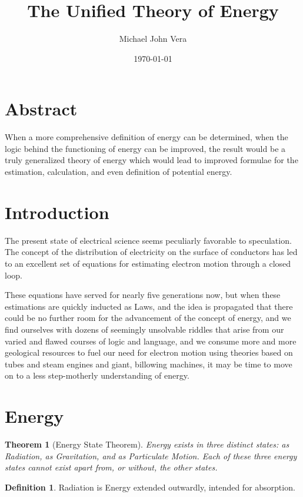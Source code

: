 \documentclass[12pt]{article}
\title{The Unified Theory of Energy}
\author{Michael John Vera}
\date{\today}
\theoremstyle{plain}
\newtheorem{theorem}{Theorem}
\theoremstyle{definition}
\newtheorem{definition}{Definition}
\begin{document}
\maketitle

\section*{Abstract}
When a more comprehensive definition of energy can be determined, when the logic behind the functioning of energy can be improved, the result would be a truly generalized theory of energy which would lead to improved formulae for the estimation, calculation, and even definition of potential energy.

\section*{Introduction}
The present state of electrical science seems peculiarly favorable to speculation. The concept of the distribution of electricity on the surface of conductors has led to an excellent set of equations for estimating electron motion through a closed loop.

These equations have served for nearly five generations now, but when these estimations are quickly inducted as Laws, and the idea is propagated that there could be no further room for the advancement of the concept of energy, and we find ourselves with dozens of seemingly unsolvable riddles that arise from our varied and flawed courses of logic and language, and we consume more and more geological resources to fuel our need for electron motion using theories based on tubes and steam engines and giant, billowing machines, it may be time to move on to a less step-motherly understanding of energy.

\section*{Energy}

\begin{theorem}[Energy State Theorem]
Energy exists in three distinct states: as Radiation, as Gravitation, and as Particulate Motion. Each of these three energy states cannot exist apart from, or without, the other states.
\end{theorem}

\begin{definition}
Radiation is Energy extended outwardly, intended for absorption.
\end{definition}
\end{document}
